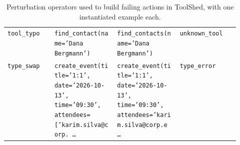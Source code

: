 \begin{table}[H]
\begin{tabular}{l p{0.27\linewidth} p{0.27\linewidth} l}
\texttt{tool\_typo} & \texttt{\verbfont find\_\allowbreak{}contact(\allowbreak{}name=\allowbreak{}'Dana Bergmann')} & \texttt{\verbfont find\_\allowbreak{}contacts(\allowbreak{}name=\allowbreak{}'Dana Bergmann')} & \texttt{\verbfont unknown\_tool} \\
\texttt{type\_swap} & \texttt{\verbfont create\_\allowbreak{}event(\allowbreak{}title=\allowbreak{}'1:1',\allowbreak{} date=\allowbreak{}'2026-10-13',\allowbreak{} time=\allowbreak{}'09:30',\allowbreak{} attendees=\allowbreak{}['karim.silva@corp.\,\allowbreak{}\ldots{}} & \texttt{\verbfont create\_\allowbreak{}event(\allowbreak{}title=\allowbreak{}'1:1',\allowbreak{} date=\allowbreak{}'2026-10-13',\allowbreak{} time=\allowbreak{}'09:30',\allowbreak{} attendees=\allowbreak{}'karim.silva@corp.e\,\allowbreak{}\ldots{}} & \texttt{\verbfont type\_error} \\
\bottomrule
\end{tabular}
\caption{Perturbation operators used to build failing actions in ToolShed, with one instantiated example each.}
\label{tab:operators}
\end{table}
